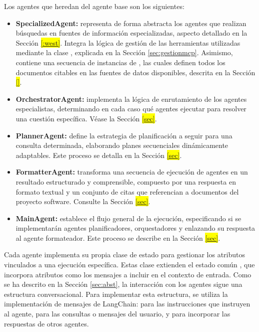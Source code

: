 Los agentes que heredan del agente base son los siguientes:
\begin{itemize}
  \item \textbf{SpecializedAgent:} representa de forma abstracta los agentes que realizan búsquedas en fuentes de información especializadas, aspecto detallado en la Sección \colorbox{yellow}{\ref{:west}}. Integra la lógica de gestión de las herramientas utilizadas mediante la clase , explicada en la Sección \ref{sec:gestionmcp}. Asimismo, contiene una secuencia de instancias de , las cuales definen todos los documentos citables en las fuentes de datos disponibles, descrita en la Sección \colorbox{yellow}{\ref{}}.
  \item \textbf{OrchestratorAgent:} implementa la lógica de enrutamiento de los agentes especialistas, determinando en cada caso qué agentes ejecutar para resolver una cuestión específica. Véase la Sección \colorbox{yellow}{\ref{sec}}.
  \item \textbf{PlannerAgent:} define la estrategia de planificación a seguir para una consulta determinada, elaborando planes secuenciales dinámicamente adaptables. Este proceso se detalla en la Sección \colorbox{yellow}{\ref{sec}}.
  \item \textbf{FormatterAgent:} transforma una secuencia de ejecución de agentes en un resultado estructurado y comprensible, compuesto por una respuesta en formato textual y un conjunto de citas que referencian a documentos del proyecto software. Consulte la Sección \colorbox{yellow}{\ref{sec}}.
  \item \textbf{MainAgent:} establece el flujo general de la ejecución, especificando si se implementarán agentes planificadores, orquestadores y enlazando su respuesta al agente formateador. Este proceso se describe en la Sección \colorbox{yellow}{\ref{sec}}.
\end{itemize}

Cada agente implementa su propia clase de estado para gestionar los atributos vinculados a una ejecución específica. Estas clase extienden el estado común , que incorpora atributos como los mensajes a incluir en el contexto de entrada. Como se ha descrito en la Sección \ref{sec:abst}, la interacción con los agentes sigue una estructura conversacional. Para implementar esta estructura, se utiliza la implementación de mensajes de LangChain:  para las instrucciones que instruyen al agente,  para las consultas o mensajes del usuario, y  para incorporar las respuestas de otros agentes.

